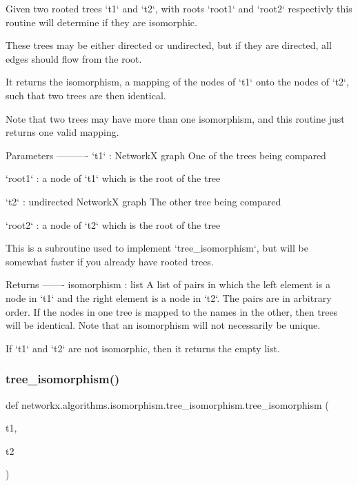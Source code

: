 \begin{DoxyVerb}Given two rooted trees `t1` and `t2`,
with roots `root1` and `root2` respectivly
this routine will determine if they are isomorphic.

These trees may be either directed or undirected,
but if they are directed, all edges should flow from the root.

It returns the isomorphism, a mapping of the nodes of `t1` onto the nodes
of `t2`, such that two trees are then identical.

Note that two trees may have more than one isomorphism, and this
routine just returns one valid mapping.

Parameters
----------
`t1` :  NetworkX graph
    One of the trees being compared

`root1` : a node of `t1` which is the root of the tree

`t2` : undirected NetworkX graph
    The other tree being compared

`root2` : a node of `t2` which is the root of the tree

This is a subroutine used to implement `tree_isomorphism`, but will
be somewhat faster if you already have rooted trees.

Returns
-------
isomorphism : list
    A list of pairs in which the left element is a node in `t1`
    and the right element is a node in `t2`.  The pairs are in
    arbitrary order.  If the nodes in one tree is mapped to the names in
    the other, then trees will be identical. Note that an isomorphism
    will not necessarily be unique.

    If `t1` and `t2` are not isomorphic, then it returns the empty list.
\end{DoxyVerb}
 \mbox{\label{namespacenetworkx_1_1algorithms_1_1isomorphism_1_1tree__isomorphism_a5a92453309ab6be345c022472c2200d2}} 
\subsubsection{\texorpdfstring{tree\+\_\+isomorphism()}{tree\_isomorphism()}}
{\footnotesize\ttfamily def networkx.\+algorithms.\+isomorphism.\+tree\+\_\+isomorphism.\+tree\+\_\+isomorphism (\begin{DoxyParamCaption}\item[{}]{t1,  }\item[{}]{t2 }\end{DoxyParamCaption})}

